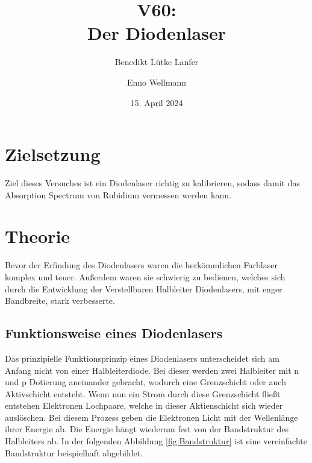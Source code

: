 

\title{V60:\\ Der Diodenlaser}
\author{Benedikt Lütke Lanfer \and Enno Wellmann}
\date{15. April 2024}
\publishers{TU Dortmund – Fakultät Physik}



\tableofcontents
\newpage

\section{Zielsetzung}
Ziel dieses Versuches ist ein Diodenlaser richtig zu kalibrieren, sodass damit das Absorption Spectrum von Rubidium vermessen werden kann. 

\section{Theorie}
Bevor der Erfindung des Diodenlasers waren die herkömmlichen Farblaser komplex und teuer. 
Außerdem waren sie schwierig zu bedienen, welches sich durch die Entwicklung der Verstellbaren Halbleiter Diodenlasers, mit enger Bandbreite, stark verbesserte. 

\subsection{Funktionsweise eines Diodenlasers}
Das prinzipielle Funktionsprinzip eines Diodenlasers unterscheidet sich am Anfang nicht von einer Halbleiterdiode. 
Bei dieser werden zwei Halbleiter mit n und p Dotierung aneinander gebracht, wodurch eine Grenzschicht oder auch Aktivschicht entsteht.  
Wenn nun ein Strom durch diese Grenzschicht fließt entstehen Elektronen Lochpaare, welche in dieser Aktienschicht sich wieder auslöschen. 
Bei diesem Prozess geben die Elektronen Licht mit der Wellenlänge ihrer Energie ab. 
Die Energie hängt wiederum fest von der Bandstruktur des Halbleiters ab.
In der folgenden Abbildung \eqref{fig:Bandstruktur} ist eine vereinfachte Bandstruktur beispielhaft abgebildet. 

